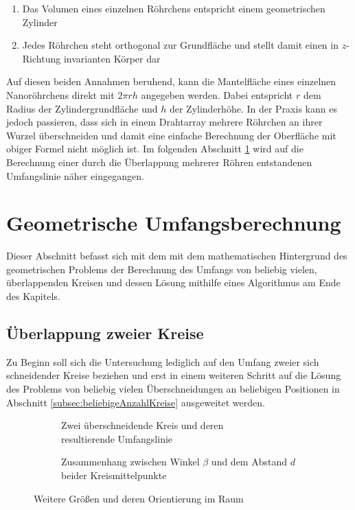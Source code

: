 \documentclass[accentcolor=tud1c, 11pt, toc=bib, toc=listof, captions=abovetable, parskip=half]{tudreport}
\begin{document}
\begin{enumerate}
\item Das Volumen eines einzelnen Röhrchens entspricht einem geometrischen Zylinder
\item Jedes Röhrchen steht orthogonal zur Grundfläche und stellt damit einen in $z$-Richtung invarianten Körper dar
\end{enumerate}

Auf diesen beiden Annahmen beruhend, kann die Mantelfläche eines einzelnen Nanoröhrchens direkt mit $2 \pi r h$ angegeben werden. Dabei entspricht $r$ dem Radius der Zylindergrundfläche und $h$  der Zylinderhöhe.
In der Praxis kann es jedoch passieren, dass sich in einem Drahtarray mehrere Röhrchen an ihrer Wurzel überschneiden und damit eine einfache Berechnung der Oberfläche mit obiger Formel nicht möglich ist. Im folgenden Abschnitt \ref{sec:geomUmfangsberechnung} wird auf die Berechnung einer durch die Überlappung mehrerer Röhren entstandenen Umfangslinie näher eingegangen. 

\section{Geometrische Umfangsberechnung}
\label{sec:geomUmfangsberechnung}
Dieser Abschnitt befasst sich mit dem mit dem mathematischen Hintergrund des geometrischen Problems der Berechnung des Umfangs von beliebig vielen, überlappenden Kreisen und dessen Lösung mithilfe eines Algorithmus am Ende des Kapitels.\\

\subsection{Überlappung zweier Kreise}
Zu Beginn soll sich die Untersuchung lediglich auf den Umfang zweier sich schneidender Kreise beziehen und erst in einem weiteren Schritt auf die Lösung des Problems von beliebig vielen Überschneidungen an beliebigen Positionen in Abschnitt \ref{subsec:beliebigeAnzahlKreise} ausgeweitet werden.

\begin{figure}[h!]
\begin{subfigure}[b]{0.475\textwidth}
\centering

\caption{Zwei überschneidende Kreis und deren\\resultierende Umfangslinie}
\label{fig:zweiKreise}
\end{subfigure}
\begin{subfigure}[b]{0.475\textwidth}
\centering

\caption{Zusammenhang zwischen Winkel $\beta$ und dem Abstand $d$ beider Kreismittelpunkte}
\label{fig:winkelBerechnung}
\end{subfigure}
\caption{Weitere Größen und deren Orientierung im Raum}
\end{figure}
\end{document}
